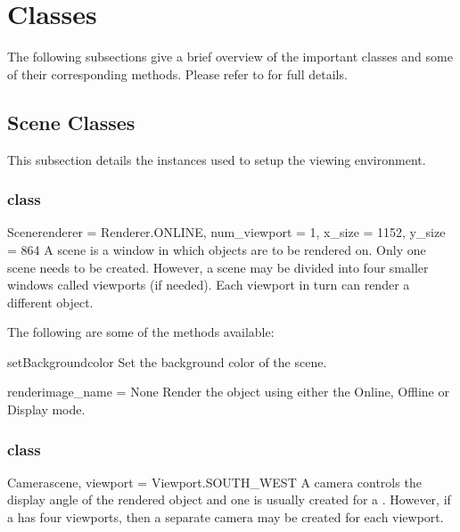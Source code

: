 \section{\pyvisi Classes}
The following subsections give a brief overview of the important classes 
and some of their corresponding methods. Please refer to \ReferenceGuide for 
full details.




\subsection{Scene Classes}
This subsection details the instances used to setup the viewing environment.

\subsubsection{\Scene class}

\begin{classdesc}{Scene}{renderer = Renderer.ONLINE, num_viewport = 1, 
x_size = 1152, y_size = 864}
A scene is a window in which objects are to be rendered on. Only 
one scene needs to be created. However, a scene may be divided into four 
smaller windows called viewports (if needed). Each viewport in turn can 
render a different object. 
\end{classdesc}

The following are some of the methods available:
\begin{methoddesc}[Scene]{setBackground}{color}
Set the background color of the scene.
\end{methoddesc}

\begin{methoddesc}[Scene]{render}{image_name = None}
Render the object using either the Online, Offline or Display mode.
\end{methoddesc}

\subsubsection{\Camera class}

\begin{classdesc}{Camera}{scene, viewport = Viewport.SOUTH_WEST}
A camera controls the display angle of the rendered object and one is 
usually created for a \Scene. However, if a \Scene has four viewports, then a 
separate camera may be created for each viewport. 
\end{classdesc}

